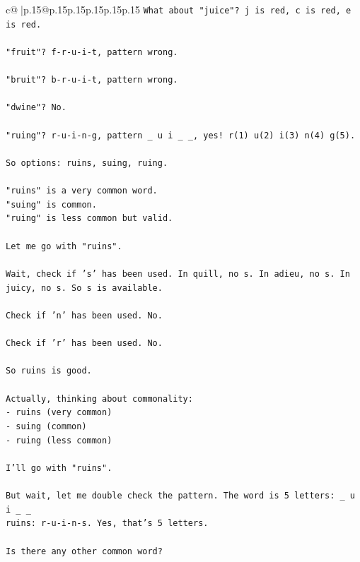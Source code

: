 \documentclass{article}
\begin{document}
{\begin{supertabular}{c@{$\;$}|p{.15\linewidth}@{}p{.15\linewidth}p{.15\linewidth}p{.15\linewidth}p{.15\linewidth}p{.15\linewidth}}
{{{\texttt{What about "juice"? j is red, c is red, e is red.} \\
\\ 
\texttt{"fruit"? f{-}r{-}u{-}i{-}t, pattern wrong.} \\
\\ 
\texttt{"bruit"? b{-}r{-}u{-}i{-}t, pattern wrong.} \\
\\ 
\texttt{"dwine"? No.} \\
\\ 
\texttt{"ruing"? r{-}u{-}i{-}n{-}g, pattern \_ u i \_ \_, yes! r(1) u(2) i(3) n(4) g(5).} \\
\\ 
\texttt{So options: ruins, suing, ruing.} \\
\\ 
\texttt{"ruins" is a very common word.} \\
\texttt{"suing" is common.} \\
\texttt{"ruing" is less common but valid.} \\
\\ 
\texttt{Let me go with "ruins".} \\
\\ 
\texttt{Wait, check if 's' has been used. In quill, no s. In adieu, no s. In juicy, no s. So s is available.} \\
\\ 
\texttt{Check if 'n' has been used. No.} \\
\\ 
\texttt{Check if 'r' has been used. No.} \\
\\ 
\texttt{So ruins is good.} \\
\\ 
\texttt{Actually, thinking about commonality:} \\
\texttt{{-} ruins (very common)} \\
\texttt{{-} suing (common)} \\
\texttt{{-} ruing (less common)} \\
\\ 
\texttt{I'll go with "ruins".} \\
\\ 
\texttt{But wait, let me double check the pattern. The word is 5 letters: \_ u i \_ \_} \\
\texttt{ruins: r{-}u{-}i{-}n{-}s. Yes, that's 5 letters.} \\
\\ 
\texttt{Is there any other common word?} \\
}}}
\end{supertabular}}
\end{document}

